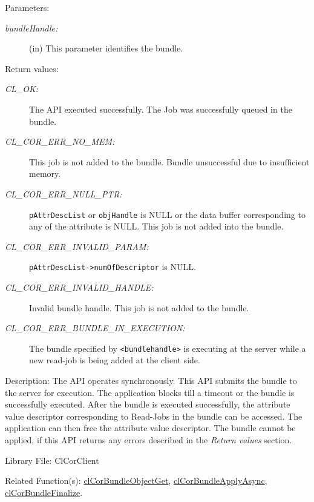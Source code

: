 \begin{flushleft}
\begin{Desc}
\begin{verbatim}
\end{verbatim}
\normalsize
\end{Desc}
\begin{Desc}
\item[Parameters:]
\begin{description}
\item[{\em bundle\-Handle:}](in) This parameter identifies the bundle.
\end{description}
\end{Desc}
\begin{Desc}
\item[Return values:]
\begin{description}
\item[{\em CL\_\-OK:}]The API executed successfully. The Job was successfully queued in the bundle.
\item[{\em CL\_\-COR\_\-ERR\_\-NO\_\-MEM:}] This job is not added to the bundle. Bundle unsuccessful due to insufficient memory. 
\item[{\em CL\_\-COR\_\-ERR\_\-NULL\_\-PTR:}] {\tt{pAttrDescList}} or {\tt{objHandle}} is NULL or the data buffer corresponding to any of the attribute 
is NULL. This job is not added into the bundle.
\item[{\em CL\_\-COR\_\-ERR\_\-INVALID\_\-PARAM:}] {\tt{pAttrDescList->numOfDescriptor}} is NULL.
\item[{\em CL\_\-COR\_\-ERR\_\-INVALID\_\-HANDLE:}] Invalid bundle handle. This job is not added to the bundle.
\item[{\em CL\_\-COR\_\-ERR\_\-BUNDLE\_\-IN\_\-EXECUTION:}] The bundle specified by {\tt{<bundlehandle>}} is executing at the server while a new read-job is 
being added at the client side.
\end{description}
\end{Desc}
\begin{Desc}
\item[Description:] The API operates synchronously. This API submits the bundle to the server for execution. The application blocks till a timeout
or the bundle is successfully executed. After the bundle is executed successfully, the attribute value descriptor corresponding to Read-Jobs in the
bundle can be accessed. The application can then free the attribute value descriptor. The bundle cannot be applied, if this API returns
any errors described in the \textit{Return values} section.

\end{Desc}
\begin{Desc}
\item[Library File:]Cl\-Cor\-Client\end{Desc}
\begin{Desc}
\item[Related Function(s):]\hyperlink{pagecor150}{clCorBundleObjectGet}, \hyperlink{pagecor152}{clCorBundleApplyAsync}, 
\hyperlink{pagecor154}{clCorBundleFinalize}.
\end{Desc} 	
\newpage




\end{flushleft}

